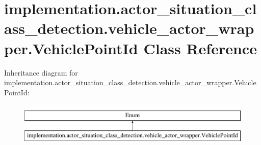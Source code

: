 \hypertarget{classimplementation_1_1actor__situation__class__detection_1_1vehicle__actor__wrapper_1_1_vehicle_point_id}{}\section{implementation.\+actor\+\_\+situation\+\_\+class\+\_\+detection.\+vehicle\+\_\+actor\+\_\+wrapper.\+Vehicle\+Point\+Id Class Reference}
\label{classimplementation_1_1actor__situation__class__detection_1_1vehicle__actor__wrapper_1_1_vehicle_point_id}
Inheritance diagram for implementation.\+actor\+\_\+situation\+\_\+class\+\_\+detection.\+vehicle\+\_\+actor\+\_\+wrapper.\+Vehicle\+Point\+Id\+:\begin{figure}[H]
\begin{center}
\leavevmode
\includegraphics[height=2.000000cm]{classimplementation_1_1actor__situation__class__detection_1_1vehicle__actor__wrapper_1_1_vehicle_point_id}
\end{center}
\end{figure}
